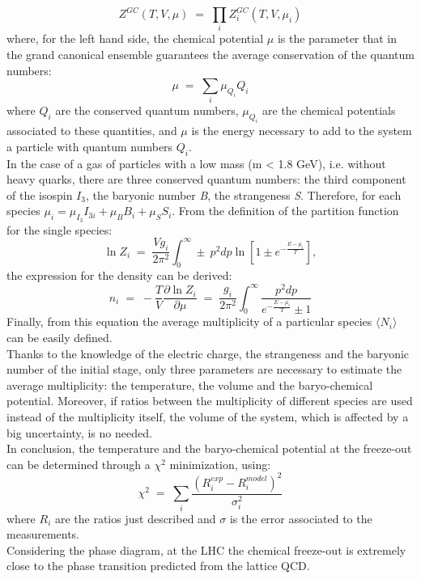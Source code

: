 \begin{equation}
 Z^{GC}(T,V,\mu)\; = \;\prod_{i}Z^{GC}_{i}(T,V,\mu_{i})
\end{equation}
where, for the left hand side, the chemical potential $\mu$ is the parameter that in the grand canonical ensemble guarantees the average conservation of the quantum numbers:
\begin{equation}
\mu \; = \;\sum_{i} \mu_{Q_{i}}Q_{i}
\end{equation}
where $Q_{i}$ are the conserved quantum numbers, $\mu_{Q_{i}}$ are the chemical potentials associated to these quantities, and $\mu$ is the energy necessary to add to the system a particle with quantum numbers $Q_{i}$.\\
In the case of a gas of particles with a low mass (m < 1.8 GeV), i.e. without heavy quarks, there are three conserved quantum numbers: the third component of the isospin $I_{3}$, the baryonic number \textit{B}, the strangeness \textit{S}. Therefore, for each species $\mu_{i} = \mu_{I_{3}}I_{3i} + \mu_{B}B_{i} + \mu_{S}S_{i}$.
From the definition of the partition function for the single species:
\begin{equation}
 \ln Z_{i}\; = \; \frac{Vg_{i}}{2\pi^{2}}\int_{0}^{\infty}\pm\:p^{2}dp\ln[1\pm e^{-\frac{E-\mu_{i}}{T}}],
\end{equation}
the expression for the density can be derived:
\begin{equation}
n_{i}\; = \; -\frac{T}{V} \frac{\partial \ln Z_{i}}{\partial \mu} \;=\; \frac{g_{i}}{2\pi^{2}} \int_{0}^{\infty}\frac{p^{2}dp}{e^{-\frac{E-\mu_{i}}{T}}\pm1}
\end{equation}
Finally, from this equation the average multiplicity of a particular species $\langle N_{i} \rangle$ can be easily defined.\\
Thanks to the knowledge of the electric charge, the strangeness and the baryonic number of the initial stage, only three parameters are necessary to estimate the average multiplicity: the temperature, the volume and the baryo-chemical potential. Moreover, if ratios between the multiplicity of different species are used instead of the multiplicity itself, the volume of the system, which is affected by a big uncertainty, is no needed.\\
In conclusion, the temperature and the baryo-chemical potential at the freeze-out can be determined through a $\chi^{2}$ minimization, using:
\begin{equation}
 \chi^{2}\;=\;\sum_{i}\frac{(R_{i}^{exp}-R_{i}^{model})^{2}}{\sigma_{i}^{2}}
\end{equation}
where $R_{i}$ are the ratios just described and $\sigma$ is the error associated to the measurements.\\
Considering the phase diagram, at the LHC the chemical freeze-out is extremely close to the phase transition predicted from the lattice QCD.\\
%
